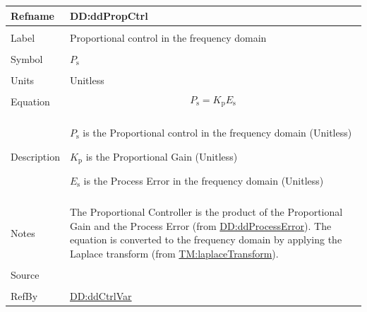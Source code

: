 \documentclass[12pt]{article}
\begin{document}
\vspace{\baselineskip}
\noindent
\begin{minipage}{\textwidth}
\begin{tabular}{>{\raggedright}p{}>{\raggedright\arraybackslash}p{}}
\toprule \textbf{Refname} & \textbf{DD:ddPropCtrl}
\label{DD:ddPropCtrl}
\\ \midrule \\
Label & Proportional control in the frequency domain
        
\\ \midrule \\
Symbol & ${P_{\text{s}}}$
         
\\ \midrule \\
Units & Unitless
        
\\ \midrule \\
Equation & \begin{displaymath}
           {P_{\text{s}}}={K_{\text{p}}} {E_{\text{s}}}
           \end{displaymath}
\\ \midrule \\
Description & \begin{symbDescription}
              \item{${P_{\text{s}}}$ is the Proportional control in the frequency domain (Unitless)}
              \item{${K_{\text{p}}}$ is the Proportional Gain (Unitless)}
              \item{${E_{\text{s}}}$ is the Process Error in the frequency domain (Unitless)}
              \end{symbDescription}
\\ \midrule \\
Notes & The Proportional Controller is the product of the Proportional Gain and the Process Error (from \hyperref[DD:ddProcessError]{DD:ddProcessError}). The equation is converted to the frequency domain by applying the Laplace transform (from \hyperref[TM:laplaceTransform]{TM:laplaceTransform}).
        
\\ \midrule \\
Source & \cite{johnson2008}
         
\\ \midrule \\
RefBy & \hyperref[DD:ddCtrlVar]{DD:ddCtrlVar}
        
\\ \bottomrule
\end{tabular}
\end{minipage}
\end{document}
